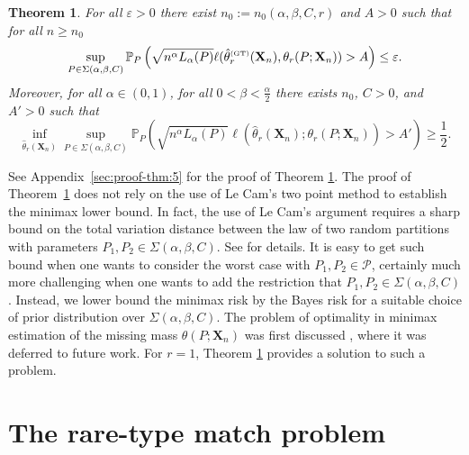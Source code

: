 \documentclass{article}
\newtheorem{theorem}{Theorem}
\newcommand{\1}{\boldsymbol{1}}
\newcommand{\PP}{\mathbb{P}}
\theoremstyle{plain}
\begin{document}
\begin{theorem}
  \label{thm:5}
  For all $\varepsilon > 0$ there exist $n_0:= n_0(\alpha,\beta,C,r)$ and $A >0$ such that for all $n \geq n_0$
  \begin{displaymath}
    \label{eq:18}
    \sup_{P\in \Sigma(\alpha,\beta,C)}\PP_P\left( \sqrt{n^{\alpha}L_{\alpha}(P) }\ell(\hat{\theta}_{r}^{\text{\tiny{(GT)}}}(\mathbf{X}_{n}),\theta_r(P;\mathbf{X}_n))  > A\right)%
    \leq \varepsilon.
  \end{displaymath}
  Moreover, for all $\alpha \in (0,1)$, for all $0 < \beta < \frac{\alpha}{2}$ there exists $n_0$, $C > 0$, and $A' > 0$ such that
  \begin{displaymath}
    \inf_{\hat{\theta}_r(\mathbf{X}_{n})}\sup_{P\in \Sigma(\alpha,\beta,C)}\PP_P\left(\sqrt{n^{\alpha}L_{\alpha}(P) }\ell(\hat{\theta}_r(\mathbf{X}_n);\theta_r(P;\mathbf{X}_n))  > A' \right)%
    \geq \frac{1}{2}.
  \end{displaymath}
\end{theorem}

See Appendix~\ref{sec:proof-thm:5} for the proof of Theorem \ref{thm:5}. The proof of Theorem~\ref{thm:5} does not rely on the use of  Le Cam's two point method to establish the minimax lower bound. In fact, the use of Le Cam's argument requires a sharp bound on the total variation distance between the law of two random partitions with parameters $P_1,P_2 \in \Sigma(\alpha,\beta,C)$. See \cite[Proposition 1]{Fav(22)} for details.  It is easy to get such bound when one wants to consider the worst case with $P_1,P_2 \in \mathcal{P}$, certainly much more challenging when one wants to add the restriction that $P_1,P_2 \in \Sigma(\alpha,\beta,C)$. Instead, we lower bound the minimax risk by the Bayes risk for a suitable choice of prior distribution over $\Sigma(\alpha,\beta,C)$. The problem of optimality in minimax estimation of the missing mass $\theta(P;\mathbf{X}_{n})$ was first discussed \cite{Fad(18)}, where it was deferred to future work. For $r=1$, Theorem \ref{thm:5} provides a solution to such a problem.


\section{The rare-type match problem}\label{sec3}\label{sec3}
\end{document}
